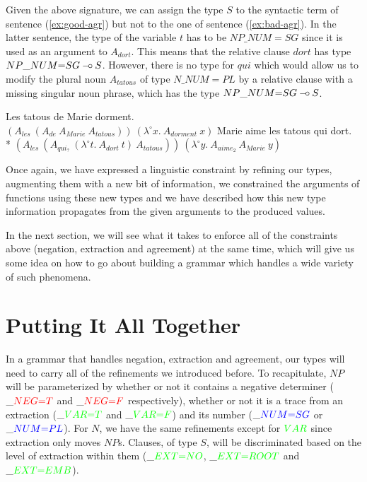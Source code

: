 Given the above signature, we can assign the type $S$ to the syntactic
term of sentence (\ref{ex:good-agr}) but not to the one of sentence
(\ref{ex:bad-agr}). In the latter sentence, the type of the variable $t$
has to be $NP\_NUM{=}SG$ since it is used as an argument to $A_{dort}$. This
means that the relative clause $dort$ has type $NP\_NUM{=}SG \mathbin{{-}\mkern-3.5mu{\circ}}
S$. However, there is no type for $qui$ which would allow us to modify
the plural noun $A_{tatous}$ of type $N\_NUM{=}PL$ by a relative clause with a
missing singular noun phrase, which has the type $NP\_NUM{=}SG \mathbin{{-}\mkern-3.5mu{\circ}} S$.

\begin{exe}
  \ex \label{ex:good-agr} Les tatous de Marie dorment. \\
      $(A_{les}\ (A_{de}\ A_{Marie}\ A_{tatous}))\ (\lambda^{\circ} x.\ A_{dorment}\ x)$
  \ex * \label{ex:bad-agr} Marie aime les tatous qui dort. \\
      * $(A_{les}\ (A_{qui_?}\ (\lambda^{\circ} t.\ A_{dort}\ t)\ A_{tatous}))\ (\lambda^{\circ} y.\ A_{aime_2}\ A_{Marie}\ y)$
\end{exe}

Once again, we have expressed a linguistic constraint by refining our
types, augmenting them with a new bit of information, we constrained the
arguments of functions using these new types and we have described how
this new type information propagates from the given arguments to the
produced values.

In the next section, we will see what it takes to enforce all of the
constraints above (negation, extraction and agreement) at the same time,
which will give us some idea on how to go about building a grammar which
handles a wide variety of such phenomena.


\section{Putting It All Together}

In a grammar that handles negation, extraction and agreement, our types
will need to carry all of the refinements we introduced before. To
recapitulate, $NP$ will be parameterized by whether or not it contains a
negative determiner ($\_\textcolor{red}{NEG{=}T}$ and
$\_\textcolor{red}{NEG{=}F}$ respectively), whether or not it is a trace
from an extraction ($\_\textcolor{green}{VAR{=}T}$ and
$\_\textcolor{green}{VAR{=}F}$) and its number
($\_\textcolor{blue}{NUM{=}SG}$ or $\_\textcolor{blue}{NUM{=}PL}$). For
$N$, we have the same refinements except for $\textcolor{green}{VAR}$
since extraction only moves $NP$s. Clauses, of type $S$, will be
discriminated based on the level of extraction within them
($\_\textcolor{green}{EXT{=}NO}$, $\_\textcolor{green}{EXT{=}ROOT}$ and
$\_\textcolor{green}{EXT{=}EMB}$).


